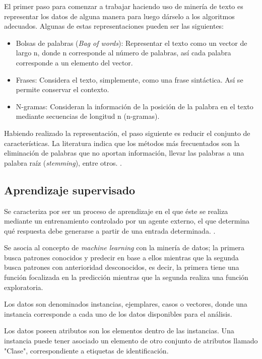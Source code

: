 	El primer paso para comenzar a trabajar haciendo uso de minería de texto es representar los datos de alguna manera para luego dárselo a los algoritmos adecuados. Algunas de estas representaciones pueden ser las siguientes:

	\begin{itemize}
	\item Bolsas de palabras (\textit{Bag of words}): Representar el texto como un vector de largo n, donde n corresponde al número de palabras, así cada palabra corresponde a un elemento del vector.
	\item Frases: Considera el texto, simplemente, como una frase sintáctica. Así se permite conservar el contexto.
	\item N-gramas: Consideran la información de la posición de la palabra en el texto mediante secuencias de longitud n (n-gramas). 
	\end{itemize}

	Habiendo realizado la representación, el paso siguiente es reducir el conjunto de características. La literatura indica que los métodos más frecuentados son la eliminación de palabras que no aportan información, llevar las palabras a una palabra raíz (\textit{stemming}), entre otros. \cite{DMPreprocessing}.

\subsection{Aprendizaje supervisado}
\label{subsec:aprendSuperv}

Se caracteriza por ser un proceso de aprendizaje en el que éste se realiza mediante un entrenamiento controlado por un agente externo, el que determina qué respuesta debe generarse a partir de una entrada determinada. \cite{AprendizajeSupervisado}.

Se asocia al concepto de \textit{machine learning} con la minería de datos; la primera busca patrones conocidos y predecir en base a ellos mientras que la segunda busca patrones con anterioridad desconocidos, es decir, la primera tiene una función focalizada en la predicción mientras que la segunda realiza una función exploratoria.

Los datos son denominados instancias, ejemplares, casos o vectores, donde una instancia corresponde a cada uno de los datos disponibles para el análisis.

Los datos poseen atributos son los elementos dentro de las instancias. Una instancia puede tener asociado un elemento de otro conjunto de atributos llamado "Clase", correspondiente a etiquetas de identificación.

